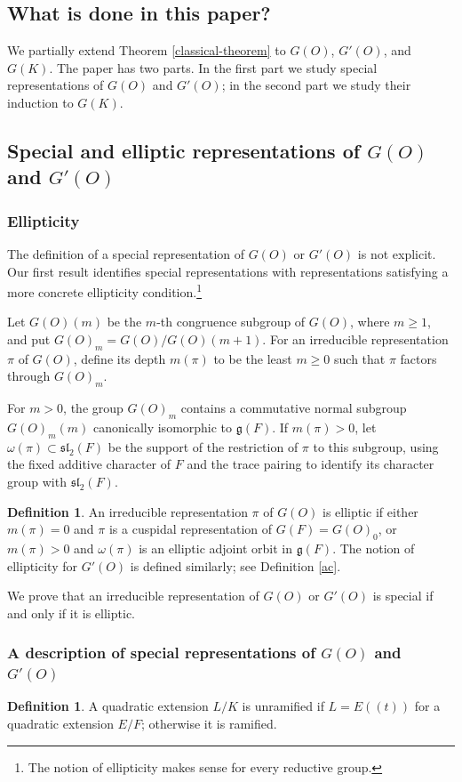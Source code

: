\documentclass[11pt,a4paper,twoside]{amsart}
\theoremstyle{definition}
\newtheorem{definition}[theorem]{Definition}
\theoremstyle{remark}
\newcommand{\bo}{\omega}
\newcommand{\fg}{\mathfrak g}
\begin{document}
\subsection{What is done in this paper?}
We partially extend Theorem \ref{classical-theorem} to $G(O)$, $G'(O)$, and $G(K)$. The paper has two parts. In the first part we study special representations of $G(O)$ and $G'(O)$; in the second part we study their induction to $G(K)$.
\subsection{Special and elliptic representations of $G(O)$ and $G'(O)$}
\subsubsection{Ellipticity}
The definition of a special representation of $G(O)$ or $G'(O)$ is not explicit. Our first result identifies special representations with representations satisfying a more concrete ellipticity condition.\footnote{The notion of ellipticity makes sense for every reductive group.}

Let $G(O)(m)$ be the $m$-th congruence subgroup of $G(O)$, where $m\geq1$, and put $G(O)_m=G(O)/G(O)(m+1)$. For an irreducible representation $\pi$ of $G(O)$, define its depth $m(\pi)$ to be the least $m\geq0$ such that $\pi$ factors through $G(O)_m$.

For $m>0$, the group $G(O)_m$ contains a commutative normal subgroup $G(O)_m(m)$ canonically isomorphic to $\fg(F)$. If $m(\pi)>0$, let $\bo(\pi)\subset\mathfrak{sl}_2(F)$ be the support of the restriction of $\pi$ to this subgroup, using the fixed additive character of $F$ and the trace pairing to identify its character group with $\mathfrak{sl}_2(F)$.
\begin{definition}
An irreducible representation $\pi$ of $G(O)$ is elliptic if either $m(\pi)=0$ and $\pi$ is a cuspidal representation of $G(F)=G(O)_0$, or $m(\pi)>0$ and $\bo(\pi)$ is an elliptic adjoint orbit in $\fg(F)$. The notion of ellipticity for $G'(O)$ is defined similarly; see Definition \ref{ac}.
\end{definition}
We prove that an irreducible representation of $G(O)$ or $G'(O)$ is special if and only if it is elliptic.
\subsubsection{A description of special representations of $G(O)$ and $G'(O)$}
\begin{definition}
A quadratic extension $L/K$ is unramified if $L=E((t))$ for a quadratic extension $E/F$; otherwise it is ramified.
\end{definition}
\end{document}
